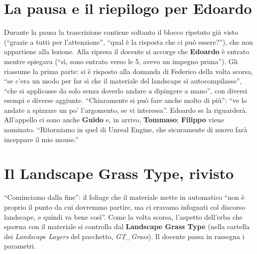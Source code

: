\section{La pausa e il riepilogo per Edoardo}
\label{ue15:sec:pausa}

Durante la pausa la trascrizione contiene soltanto il blocco ripetuto già visto (``grazie a
tutti per l'attenzione'', ``qual è la risposta che ci può essere?''), che non appartiene alla
lezione. Alla ripresa il docente si accorge che \textbf{Edoardo} è entrato mentre spiegava
(``sì, sono entrato verso le 5, avevo un impegno prima''). Gli riassume la prima parte: si è
risposto alla domanda di Federico della volta scorsa, ``se c'era un modo per far sì che il
materiale del landscape si autocompilasse'', ``che si applicasse da solo senza doverlo andare
a dipingere a mano'', con diversi esempi e diverse aggiunte. ``Chiaramente si può fare anche
molto di più'': ``ve lo andate a spizzare un po' l'argomento, se vi interessa''. Edoardo se la
riguarderà. All'appello ci sono anche \textbf{Guido} e, in arrivo, \textbf{Tommaso};
\textbf{Filippo} viene nominato. ``Ritorniamo in quel di Unreal Engine, che sicuramente di
nuovo farà inceppare il mio mouse.''

\section{Il Landscape Grass Type, rivisto}
\label{ue15:sec:grasstype}

``Cominciamo dalla fine'': il foliage che il materiale mette in automatico ``non è proprio il
punto da cui dovremmo partire, ma ci eravamo infognati col discorso landscape, e quindi va
bene così''. Come la volta scorsa, l'aspetto dell'erba che spawna con il materiale si
controlla dal \textbf{Landscape Grass Type} (nella cartella dei \emph{Landscape Layers} del
pacchetto, \emph{GT\_Grass}). Il docente passa in rassegna i parametri.


